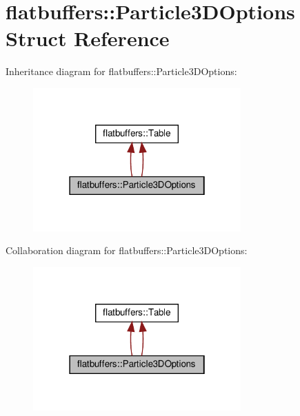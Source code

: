 \hypertarget{structflatbuffers_1_1Particle3DOptions}{}\section{flatbuffers\+:\+:Particle3\+D\+Options Struct Reference}
\label{structflatbuffers_1_1Particle3DOptions}


Inheritance diagram for flatbuffers\+:\+:Particle3\+D\+Options\+:
\nopagebreak
\begin{figure}[H]
\begin{center}
\leavevmode
\includegraphics[width=226pt]{structflatbuffers_1_1Particle3DOptions__inherit__graph}
\end{center}
\end{figure}


Collaboration diagram for flatbuffers\+:\+:Particle3\+D\+Options\+:
\nopagebreak
\begin{figure}[H]
\begin{center}
\leavevmode
\includegraphics[width=226pt]{structflatbuffers_1_1Particle3DOptions__coll__graph}
\end{center}
\end{figure}

